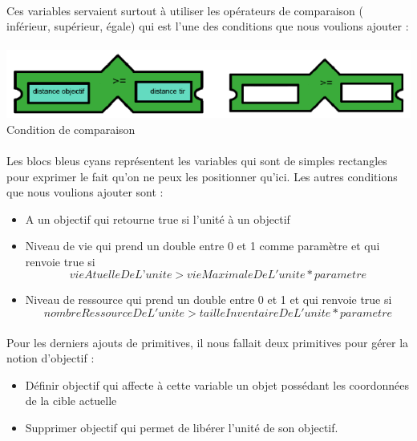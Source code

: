 \documentclass{report}
\begin{document}
\paragraph{}
  Ces variables servaient surtout à utiliser les opérateurs de comparaison ( inférieur, supérieur, égale) qui est l’une des conditions que nous voulions ajouter : 

\paragraph{}
\begin{adjustwidth}{-6em}{}
\includegraphics[scale=1]{DATA/comparaison.png}
 {Condition de comparaison}
\end{adjustwidth}
\paragraph{}

Les blocs bleus cyans représentent les variables qui sont de simples rectangles pour exprimer le fait qu’on ne peux les positionner qu’ici. \newline
Les autres conditions que nous voulions ajouter sont :
\begin{itemize}
\item A un objectif qui retourne true si l’unité à un objectif
\item Niveau de vie qui prend un double entre 0 et 1 comme paramètre et qui renvoie true si 
\[
vie Atuelle De L’unite > vie Maximale De L'unite * parametre
\]
\item Niveau de ressource qui prend un double entre 0 et 1 et qui renvoie true si 
\[
nombre Ressource De L'unite > taille Inventaire De L'unite * parametre
\]
\end{itemize}
\paragraph{}
  Pour les derniers ajouts de primitives, il nous fallait deux primitives pour gérer la notion d’objectif :
  \begin{itemize}
\item Définir objectif qui affecte à cette variable un objet possédant les coordonnées de la cible actuelle
\item Supprimer objectif qui permet de libérer l’unité de son objectif.
\end{itemize}
\end{document}
